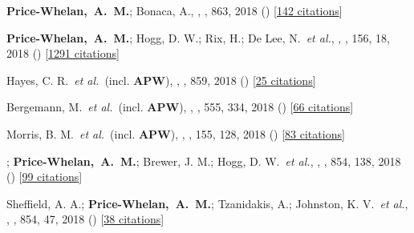 \item[{\color{deemph}\scriptsize41}]\textbf{Price-Whelan,~A.~M.}; Bonaca, A., , \apj, 863, 2018 () [\href{http://adsabs.harvard.edu/abs/2018ApJ...863L..20P}{142 citations}]

\item[{\color{deemph}\scriptsize40}]\textbf{Price-Whelan,~A.~M.}; Hogg, D. W.; Rix, H.; De Lee, N.~\textit{et al.}, , \aj, 156, 18, 2018 () [\href{http://adsabs.harvard.edu/abs/2018AJ....156...18P}{1291 citations}]

\item[{\color{deemph}\scriptsize39}]Hayes, C. R.~\textit{et al.}~(incl. \textbf{APW}), , \apj, 859, 2018 () [\href{http://adsabs.harvard.edu/abs/2018ApJ...859L...8H}{25 citations}]

\item[{\color{deemph}\scriptsize38}]Bergemann, M.~\textit{et al.}~(incl. \textbf{APW}), , \nature, 555, 334, 2018 () [\href{http://adsabs.harvard.edu/abs/2018Natur.555..334B}{66 citations}]

\item[{\color{deemph}\scriptsize37}]Morris, B. M.~\textit{et al.}~(incl. \textbf{APW}), , \aj, 155, 128, 2018 () [\href{http://adsabs.harvard.edu/abs/2018AJ....155..128M}{83 citations}]

\item[{\color{deemph}\scriptsize36}]; \textbf{Price-Whelan,~A.~M.}; Brewer, J. M.; Hogg, D. W.~\textit{et al.}, , \apj, 854, 138, 2018 () [\href{http://adsabs.harvard.edu/abs/2018ApJ...854..138O}{99 citations}]

\item[{\color{deemph}\scriptsize35}]Sheffield, A. A.; \textbf{Price-Whelan,~A.~M.}; Tzanidakis, A.; Johnston, K. V.~\textit{et al.}, , \apj, 854, 47, 2018 () [\href{http://adsabs.harvard.edu/abs/2018ApJ...854...47S}{38 citations}]

